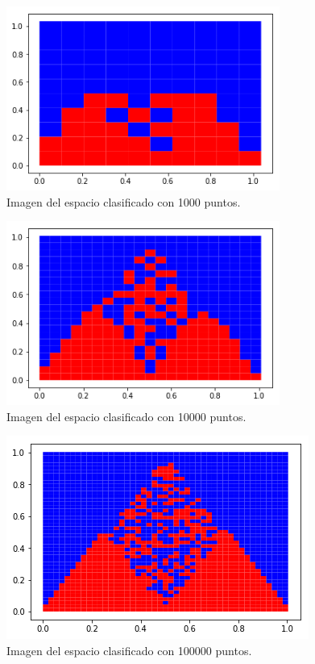 \documentclass[12pt, a4paper]{article}
\begin{document}
\begin{center}
	\begin{figure}[H]
	    \includegraphics[width = 0.8\textwidth]{grafico_1000_puntos}
	    \caption{Imagen del espacio clasificado con 1000 puntos.}
	\end{figure}

	\begin{figure}[H]
	    \includegraphics[width = 0.8\textwidth]{grafico_10000_puntos}
	    \caption{Imagen del espacio clasificado con 10000 puntos.}
	\end{figure}

	\begin{figure}[H]
	    \includegraphics[width = \textwidth]{grafico_100000_puntos}
	    \caption{Imagen del espacio clasificado con 100000 puntos.}
	\end{figure}
\end{center}
\end{document}
